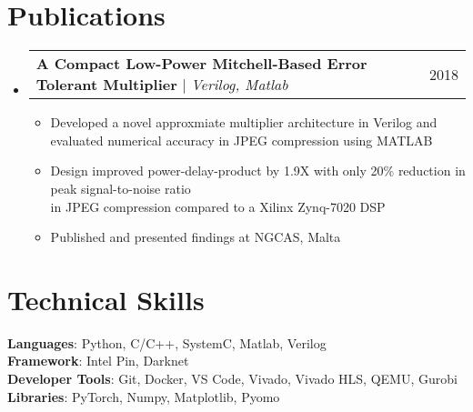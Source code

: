 \documentclass[letterpaper,11pt]{article}
\makeatletter
\newcommand{\resumeItem}[1]{
  \item\small{
    {#1 \vspace{-2pt}}
  }
}
\newcommand{\resumeProjectHeading}[2]{
    \item
    \begin{tabular*}{0.97\textwidth}{l@{\extracolsep{\fill}}r}
      \small#1 & #2 \\
    \end{tabular*}\vspace{-7pt}
}
\newcommand{\resumeSubHeadingListStart}{\begin{itemize}[leftmargin=0.15in, label={}]}
\newcommand{\resumeSubHeadingListEnd}{\end{itemize}}
\newcommand{\resumeItemListStart}{\begin{itemize}}
\newcommand{\resumeItemListEnd}{\end{itemize}\vspace{-5pt}}
\makeatother
\begin{document}
\section{Publications}
    \resumeSubHeadingListStart
      \resumeProjectHeading
          {\textbf{A Compact Low-Power Mitchell-Based Error Tolerant Multiplier} $|$ \emph{Verilog, Matlab} }{2018}
          \resumeItemListStart
            \resumeItem{Developed a novel approxmiate multiplier architecture in Verilog and evaluated numerical accuracy in JPEG compression using MATLAB }
            \resumeItem{Design improved power-delay-product by 1.9X with only 20\% reduction in peak signal-to-noise ratio \\ in JPEG compression compared to a Xilinx Zynq-7020 DSP}
            \resumeItem{Published and presented findings at NGCAS, Malta}
          \resumeItemListEnd
    \resumeSubHeadingListEnd

%
\section{Technical Skills}
 \begin{itemize}[leftmargin=0.15in, label={}]
    \small{\item{
     \textbf{Languages}{: Python, C/C++, SystemC, Matlab, Verilog} \\
     \textbf{Framework}{: Intel Pin, Darknet} \\
     \textbf{Developer Tools}{: Git, Docker, VS Code, Vivado, Vivado HLS, QEMU, Gurobi} \\
     \textbf{Libraries}{: PyTorch, Numpy, Matplotlib, Pyomo}
    }}
 \end{itemize}

\end{document}
